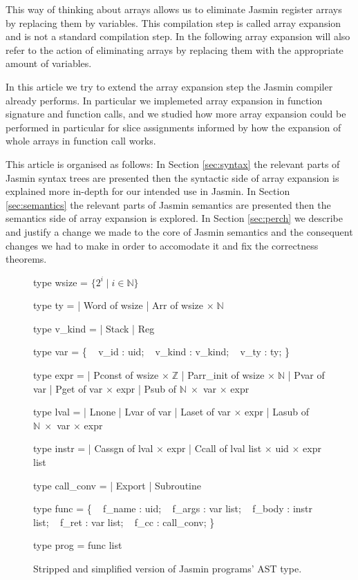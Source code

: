 \documentclass{article}
\newcommand\setZ{\mathbb{Z}}
\newcommand\setN{\mathbb{N}}
\begin{document}
This way of thinking about arrays allows us to eliminate Jasmin register arrays
by replacing them by variables. This compilation step is called array expansion
and is not a standard compilation step. In the following array expansion will
also refer to the action of eliminating arrays by replacing them with the
appropriate amount of variables.

\medskip

In this article we try to extend the array expansion step the Jasmin compiler
already performs. In particular we implemeted array expansion in function
signature and function calls, and we studied how more array expansion could be
performed in particular for slice assignments informed by how the expansion of
whole arrays in function call works.


\medskip

This article is organised as follows:
In Section \ref{sec:syntax} the relevant parts of Jasmin syntax trees are
presented then the syntactic side of array expansion is explained more in-depth
for our intended use in Jasmin.
In Section \ref{sec:semantics} the relevant parts of Jasmin semantics are
presented then the semantics side of array expansion is explored.
In Section \ref{sec:perch} we describe and justify a change we made to the core
of Jasmin semantics and the consequent changes we had to make in order to
accomodate it and fix the correctness theorems.

\begin{figure}[t]
\obeylines\obeyspaces\ttfamily%
\begin{minipage}{0.45\textwidth}
type wsize = \(\{ 2^i \mid i \in \setN \}\)

type ty =
| Word of wsize
| Arr  of wsize \(\times\;\setN\)

type v\_kind =
| Stack
| Reg

type var = \{
~ v\_id   : uid;
~ v\_kind : v\_kind;
~ v\_ty   : ty;
\}

type expr =
| Pconst    of wsize \(\times\;\setZ\)
| Parr\_init of wsize \(\times\;\setN\)
| Pvar      of var
| Pget      of var \(\times\) expr
| Psub      of \(\setN\;\times\) var \(\times\) expr
\end{minipage}\hfill\vline\hfill\begin{minipage}{0.5\textwidth}
type lval =
| Lnone
| Lvar  of var
| Laset of var \(\times\) expr
| Lasub of \(\setN\;\times\) var \(\times\) expr

type instr =
| Cassgn of lval \(\times\) expr
| Ccall  of lval list \(\times\) uid \(\times\) expr list

type call\_conv =
| Export
| Subroutine

type func = \{
~ f\_name : uid;
~ f\_args : var list;
~ f\_body : instr list;
~ f\_ret  : var list;
~ f\_cc   : call\_conv;
\}

type prog = func list
\end{minipage}\normalfont%
\caption{Stripped and simplified version of Jasmin programs' AST type.}\label{fig:types}
\end{figure}
\end{document}
